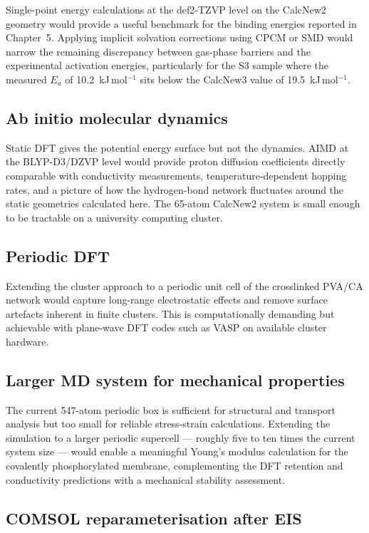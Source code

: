 \documentclass[12pt,a4paper]{report}
\begin{document}
Single-point energy calculations at the def2-TZVP level 
on the CalcNew2 geometry would provide a useful benchmark 
for the binding energies reported in Chapter~5. Applying 
implicit solvation corrections using CPCM or SMD would 
narrow the remaining discrepancy between gas-phase barriers and 
the experimental activation energies, particularly for 
the S3 sample where the measured $E_a$ of 10.2~kJ\,mol\(^{-1}\) 
sits below the CalcNew3 value of 19.5~kJ\,mol\(^{-1}\).

\subsection*{Ab initio molecular dynamics}

Static DFT gives the potential energy surface but not 
the dynamics. AIMD at the BLYP-D3/DZVP level would 
provide proton diffusion coefficients directly comparable 
with conductivity measurements, temperature-dependent 
hopping rates, and a picture of how the hydrogen-bond 
network fluctuates around the static geometries 
calculated here. The 65-atom CalcNew2 system is small 
enough to be tractable on a university computing cluster.

\subsection*{Periodic DFT}

Extending the cluster approach to a periodic unit cell 
of the crosslinked PVA/CA network would capture 
long-range electrostatic effects and remove surface 
artefacts inherent in finite clusters. This is 
computationally demanding but achievable with plane-wave 
DFT codes such as VASP on available cluster hardware.

\subsection*{Larger MD system for mechanical properties}

The current 547-atom periodic box is sufficient for 
structural and transport analysis but too small for 
reliable stress-strain calculations. Extending the 
simulation to a larger periodic supercell — roughly 
five to ten times the current system size — would 
enable a meaningful Young's modulus calculation for 
the covalently phosphorylated membrane, complementing 
the DFT retention and conductivity predictions with 
a mechanical stability assessment.

\subsection*{COMSOL reparameterisation after EIS}
\end{document}
